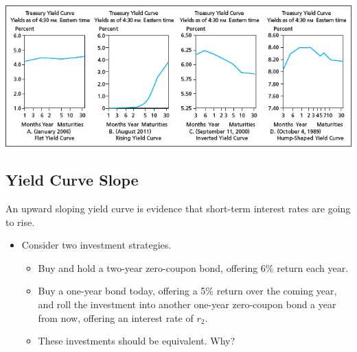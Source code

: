 \documentclass[letterpaper,10pt,english]{sphinxmanual}
\begin{document}
$\qquad$

\includegraphics[width=6in]{bod34698_1012_lg.jpg}


\subsection{Yield Curve Slope}
\label{termStructure:yield-curve-slope}
An upward sloping yield curve is evidence that short-term interest
rates are going to rise.
\begin{itemize}
\item {} 
Consider two investment strategies.
\begin{itemize}
\item {} 
Buy and hold a two-year zero-coupon bond, offering 6\% return each
year.

\end{itemize}
\begin{itemize}
\item {} 
Buy a one-year bond today, offering a 5\% return over the coming
year, and roll the investment into another one-year zero-coupon
bond a year from now, offering an interest rate of $r_2$.

\end{itemize}
\begin{itemize}
\item {} 
These investments should be equivalent. Why?

\end{itemize}

\end{itemize}
\end{document}
